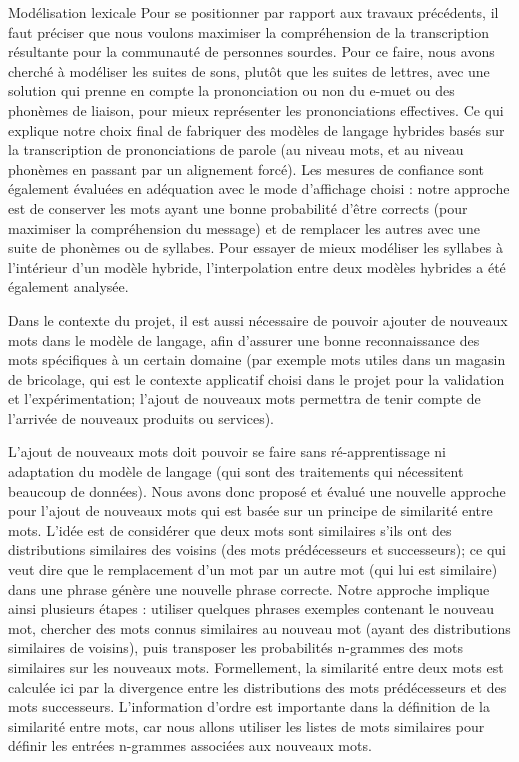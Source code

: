 \documentclass{style/these}
\begin{document}
\begin{part}{Modélisation lexicale}
Pour se positionner par rapport aux travaux précédents, il faut préciser que nous voulons maximiser la compréhension de la transcription résultante pour la communauté de personnes sourdes. 
Pour ce faire, nous avons cherché à modéliser les suites de sons, plutôt que les suites de lettres, avec une solution qui prenne en compte la prononciation ou non du e-muet ou des phonèmes de liaison, pour mieux représenter les prononciations effectives. 
Ce qui explique notre choix final de fabriquer des modèles de langage hybrides basés sur la transcription de prononciations de parole (au niveau mots, et au niveau phonèmes en passant par un alignement forcé). 
Les mesures de confiance sont également évaluées en adéquation avec le mode d'affichage choisi : notre approche est de conserver les mots ayant une bonne probabilité d'être corrects (pour maximiser la compréhension du message) et de remplacer les autres avec une suite de phonèmes ou de syllabes. 
Pour essayer de mieux modéliser les syllabes à l'intérieur d'un modèle hybride, l'interpolation entre deux modèles hybrides a été également analysée. 

Dans le contexte du projet, il est aussi nécessaire de pouvoir ajouter de nouveaux mots dans le modèle de langage, afin d'assurer une bonne reconnaissance des mots spécifiques à un certain domaine (par exemple mots utiles dans un magasin de bricolage, qui est le contexte applicatif choisi dans le projet pour la validation et l'expérimentation; l'ajout de nouveaux mots permettra de tenir compte de l'arrivée de nouveaux produits ou services).

L'ajout de nouveaux mots doit pouvoir se faire sans ré-apprentissage ni adaptation du modèle de langage (qui sont des traitements qui nécessitent beaucoup de données). 
Nous avons donc proposé et évalué une nouvelle approche pour l'ajout de nouveaux mots qui est basée sur un principe de similarité entre mots. 
L'idée est de considérer que deux mots sont similaires s'ils ont des distributions similaires des voisins (des mots prédécesseurs et successeurs); ce qui veut dire que le remplacement d'un mot par un autre mot (qui lui est similaire) dans une phrase génère une nouvelle phrase correcte. Notre approche implique ainsi plusieurs étapes : utiliser quelques phrases exemples
contenant le nouveau mot, chercher des mots connus similaires au nouveau mot (ayant des distributions similaires de voisins), puis transposer les probabilités n-grammes des mots similaires
sur les nouveaux mots. Formellement, la similarité entre deux mots est calculée ici par la divergence entre les distributions des mots prédécesseurs et des mots successeurs.
L'information d'ordre est importante dans la définition de la similarité entre mots, car nous allons utiliser les listes de mots similaires pour définir les entrées n-grammes associées aux nouveaux mots.




\end{part}
\end{document}
